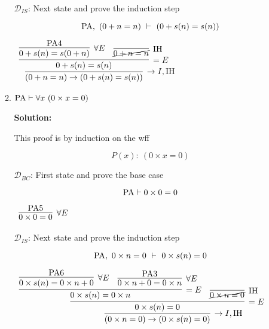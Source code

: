 \documentclass[11pt]{report}
\begin{document}
\begin{enumerate}
\begin{enumerate}
		$\mathcal{D}_{IS}$: Next state and prove the induction step

		$$ \text{PA}, \ (0 + n = n) \ \vdash \ (0 + s(n) = s(n)) $$

		\begin{mdframed}
			\begin{center}
				$\begin{array}{c}
					\infer[\to I, \IH]{(0 + n = n) \to (0 + s(n) = s(n))}
						{\infer[=E]{0 + s(n) = s(n)}
							{\infer[\forall E]{0 + s(n) = s(0+n)}{\PA 4}
							&
							\infer[\IH]{\cancel{0+n=n}}{}}}
				\end{array}$
			\end{center}
		\end{mdframed}
		
		\newpage
		\item $\text{PA} \vdash \forall x \ (0 \times x = 0)$


		{\bf Solution:} 

		This proof is by induction on the wff 

		$$ P(x) : \ (0 \times x = 0)$$

		$\mathcal{D}_{BC}$: First state and prove the base case 

		$$ \text{PA} \vdash 0 \times 0 = 0$$

		\begin{mdframed}
			\begin{center}
				$\begin{array}{c}
					\infer[\forall E]{0 \times 0 = 0}
						{\PA 5}
				\end{array}$
			\end{center}
		\end{mdframed}

		$\mathcal{D}_{IS}$: Next state and prove the induction step

		$$ \text{PA}, \ 0 \times n = 0 \ \vdash \ 0 \times s(n) = 0$$

		\begin{mdframed}
			\begin{center}
				$\begin{array}{c}
					\infer[\to I, \IH]{(0 \times n = 0) \to (0 \times s(n) = 0)}
						{\infer[=E]{0 \times s(n) = 0}
							{\infer[=E]{0 \times s(n) = 0 \times n}
								{\infer[\forall E]{0 \times s(n) = 0 \times n + 0}{\PA 6}
								&
								\infer[\forall E]{0 \times n + 0 = 0\times n}{\PA 3}}
							&
							\infer[\IH]{\cancel{0 \times n = 0}}{}}}
				\end{array}$
			\end{center}
		\end{mdframed}




\end{enumerate}
\end{enumerate}
\end{document}
